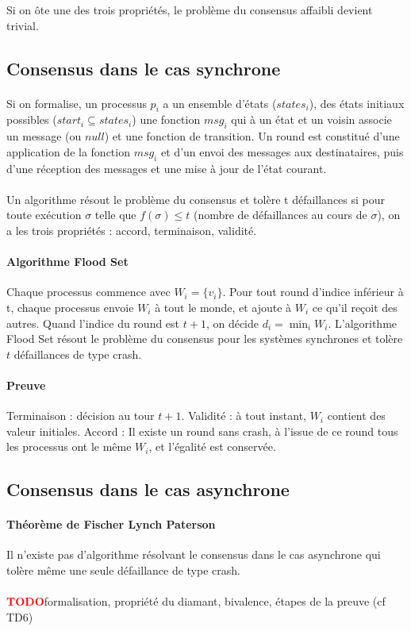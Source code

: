 \documentclass[french]{article}
\newcommand{\TODO}{\textcolor{red}{\textbf{TODO}}}
\begin{document}
Si on ôte une des trois propriétés, le problème du consensus affaibli devient trivial.

\subsection{Consensus dans le cas synchrone}

\paragraph{}Si on formalise, un processus $p_i$ a un ensemble d'états ($states_i$), des états initiaux possibles ($start_i \subseteq states_i$) une fonction $msg_i$ qui à un état et un voisin associe un message (ou $null$) et une fonction de transition.
Un round est constitué d'une application de la fonction $msg_i$ et d'un envoi des messages aux destinataires, puis d'une réception des messages et une mise à jour de l'état courant.

\paragraph{}Un algorithme résout le problème du consensus et tolère t défaillances si pour toute exécution $\sigma$ telle que $f(\sigma) \leq t$ (nombre de défaillances au cours de $\sigma$), on a les trois propriétés : accord, terminaison, validité.

\paragraph{Algorithme Flood Set} Chaque processus commence avec $W_i = \lbrace v_i \rbrace$. Pour tout round d'indice inférieur à t, chaque processus envoie $W_i$ à tout le monde, et ajoute à $W_i$ ce qu'il reçoit des autres. Quand l'indice du round est $t + 1$, on décide $d_i = \min_i W_i$. L'algorithme Flood Set résout le problème du consensus pour les systèmes synchrones et tolère $t$ défaillances de type crash.

\paragraph{Preuve} Terminaison : décision au tour $t + 1$. Validité : à tout instant, $W_i$ contient des valeur initiales. Accord : Il existe un round sans crash, à l'issue de ce round tous les processus ont le même $W_i$, et l'égalité est conservée.


\subsection{Consensus dans le cas asynchrone}

\paragraph{Théorème de Fischer Lynch Paterson}Il n'existe pas d'algorithme résolvant le consensus dans le cas asynchrone qui tolère même une seule défaillance de type crash.

\paragraph{}\TODO formalisation, propriété du diamant, bivalence, étapes de la preuve (cf TD6)
\end{document}
